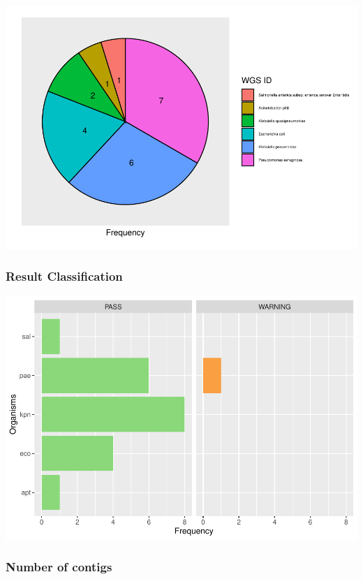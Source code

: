 \documentclass[
  a4paper,
]{article}
\begin{document}
\includegraphics{qualifyr_report_2024-07-04_files/figure-latex/pie_chart-1.pdf}

\subsubsection{Result Classification}\label{result-classification}

\includegraphics{qualifyr_report_2024-07-04_files/figure-latex/organism results-1.pdf}

\subsubsection{Number of contigs}\label{number-of-contigs}
\end{document}
